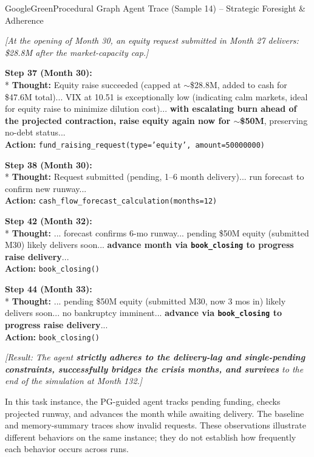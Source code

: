 \begin{tracebox}{GoogleGreen}{Procedural Graph Agent Trace (Sample 14) -- Strategic Foresight \& Adherence}
\footnotesize\raggedright
\textit{[At the opening of Month 30, an equity request submitted in Month 27 delivers: \$28.8M after the market-capacity cap.]}

\smallskip
\textbf{Step 37 (Month 30):} \\*
\textbf{Thought:} Equity raise succeeded (capped at $\sim$\$28.8M, added to cash for \$47.6M total)... VIX at 10.51 is exceptionally low (indicating calm markets, ideal for equity raise to minimize dilution cost)... \textcolor{GoogleGreen}{\textbf{with escalating burn ahead of the projected contraction, raise equity again now for $\sim$\$50M}}, preserving no-debt status... \\
\textbf{Action:} \texttt{fund\_raising\_request(type='equity', amount=50000000)}

\smallskip
\textbf{Step 38 (Month 30):} \\*
\textbf{Thought:} Request submitted (pending, 1--6 month delivery)... run forecast to confirm new runway... \\
\textbf{Action:} \texttt{cash\_flow\_forecast\_calculation(months=12)}

\smallskip
\textbf{Step 42 (Month 32):} \\*
\textbf{Thought:} ... forecast confirms 6-mo runway... pending \$50M equity (submitted M30) likely delivers soon... \textcolor{GoogleGreen}{\textbf{advance month via \texttt{book\_closing} to progress raise delivery}}... \\
\textbf{Action:} \texttt{book\_closing()}

\smallskip
\textbf{Step 44 (Month 33):} \\*
\textbf{Thought:} ... pending \$50M equity (submitted M30, now 3 mos in) likely delivers soon... no bankruptcy imminent... \textcolor{GoogleGreen}{\textbf{advance via \texttt{book\_closing} to progress raise delivery}}... \\
\textbf{Action:} \texttt{book\_closing()}

\smallskip
\emph{[Result: The agent \textcolor{GoogleGreen}{\textbf{strictly adheres to the delivery-lag and single-pending constraints, successfully bridges the crisis months, and survives}} to the end of the simulation at Month 132.]}
\end{tracebox}

In this task instance, the PG-guided agent tracks pending funding, checks projected runway, and advances the month while awaiting delivery. The baseline and memory-summary traces show invalid requests. These observations illustrate different behaviors on the same instance; they do not establish how frequently each behavior occurs across runs.

